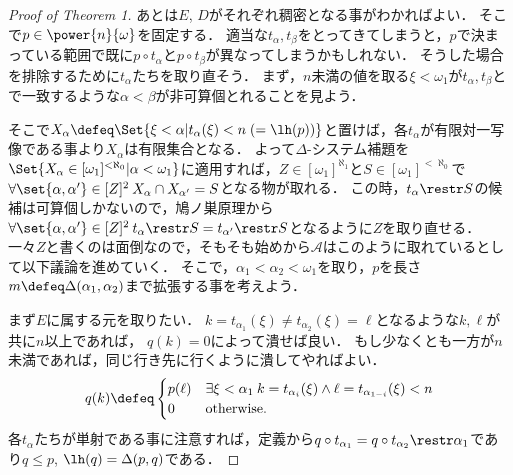 \documentclass[a4j]{ltjsarticle}
\begin{document}
\begin{proof}[Proof of Theorem 1]
 あとは$E$, $D$がそれぞれ稠密となる事がわかればよい．
 そこで$p \in \power{n}{\omega}$を固定する．
 適当な$t_\alpha, t_\beta$をとってきてしまうと，$p$で決まっている範囲で既に$p \circ t_\alpha$と$p \circ t_\beta$が異なってしまうかもしれない．
 そうした場合を排除するために$t_\alpha$たちを取り直そう．
 まず，$n$未満の値を取る$\xi < \omega_1$が$t_\alpha, t_\beta$とで一致するような$\alpha < \beta$が非可算個とれることを見よう．

 そこで$X_\alpha \defeq \Set{\xi < \alpha | t_{\alpha}(\xi) < n\; (= \lh(p))}$と置けば，各$t_\alpha$が有限対一写像である事より$X_\alpha$は有限集合となる．
 よって$\Delta$-システム補題を$\Set{X_\alpha \in [\omega_1]^{<\aleph_0} | \alpha < \omega_1}$に適用すれば，$Z \in [\omega_1]^{\aleph_1}$と$S \in [\omega_1]^{<\aleph_0}$で$\forall \set{\alpha, \alpha'} \in [Z]^2\: X_\alpha \cap X_{\alpha'} = S$となる物が取れる．
 この時，$t_\alpha \restr S$の候補は可算個しかないので，鳩ノ巣原理から$\forall \set{\alpha, \alpha'} \in [Z]^2 \: t_\alpha \restr S = t_{\alpha'} \restr S$となるように$Z$を取り直せる．
 一々$Z$と書くのは面倒なので，そもそも始めから$\mathcal{A}$はこのように取れているとして以下議論を進めていく．
 そこで，$\alpha_1 < \alpha_2 < \omega_1$を取り，$p$を長さ$m \defeq \Delta(\alpha_1, \alpha_2)$まで拡張する事を考えよう．

 まず$E$に属する元を取りたい．
 $k = t_{\alpha_1}(\xi) \neq t_{\alpha_2}(\xi) = \ell$となるような$k, \ell$が共に$n$以上であれば，
 $q(k) = 0$によって潰せば良い．
 もし少なくとも一方が$n$未満であれば，同じ行き先に行くように潰してやればよい．
 \[
  q(k) \defeq \begin{cases}
               p(\ell) & \exists \xi < \alpha_1 \: k = t_{\alpha_i}(\xi) \wedge \ell = t_{\alpha_{1-i}}(\xi) < n\\
               0 & \text{otherwise}.
              \end{cases}
 \]
 各$t_\alpha$たちが単射である事に注意すれば，定義から$q \circ t_{\alpha_1} = q \circ t_{\alpha_2} \restr \alpha_1$であり$q \leq p$, $\lh(q) = \Delta(p, q)$である．


\end{proof}
\end{document}
